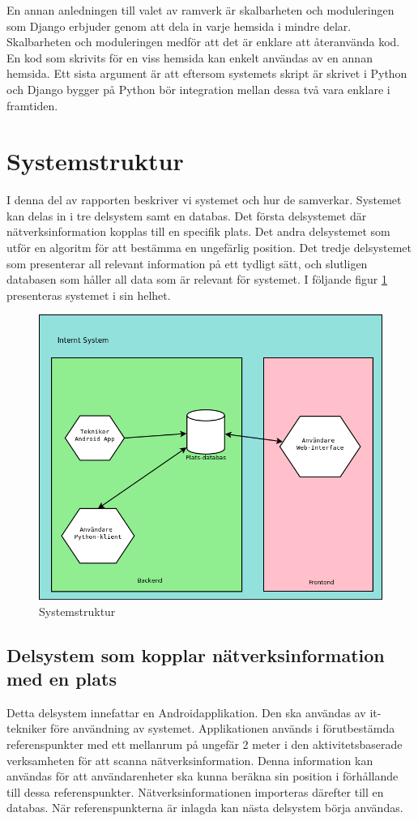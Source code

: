 \documentclass[swedish, a4paper,12pt]{article}
\begin{document}
En annan anledningen till valet av ramverk är skalbarheten och moduleringen som Django erbjuder genom att dela in varje hemsida i mindre delar. Skalbarheten och moduleringen medför att det är enklare att återanvända kod. En kod som skrivits för en viss hemsida kan enkelt användas av en annan hemsida\cite{djangoMVC}. Ett sista argument är att eftersom systemets skript är skrivet i Python och Django bygger på Python bör integration mellan dessa två vara enklare i framtiden.

\section{Systemstruktur}
I denna del av rapporten beskriver vi systemet och hur de samverkar.
Systemet kan delas in i tre delsystem samt en databas. Det första delsystemet där nätverksinformation kopplas till en specifik plats. Det andra delsystemet som utför en algoritm för att bestämma en ungefärlig position. Det tredje delsystemet som presenterar all relevant information på ett tydligt sätt, och slutligen databasen som håller all data som är relevant för systemet.
I följande figur \ref{fig:systemStruktur} presenteras systemet i sin helhet.

\begin{figure}[H]
	\includegraphics[width=15cm]{media/systemStruktur.png}
	\caption{Systemstruktur}
	\label{fig:systemStruktur}
\end{figure}

\subsection{Delsystem som kopplar nätverksinformation med en plats}
Detta delsystem innefattar en Androidapplikation. Den ska användas av it-tekniker före användning av systemet. Applikationen används i förutbestämda referenspunkter med ett mellanrum på ungefär 2 meter i den aktivitetsbaserade verksamheten för att scanna nätverksinformation. Denna information kan användas för att användarenheter ska kunna beräkna sin position i förhållande till dessa referenspunkter. Nätverksinformationen importeras därefter till en databas. När referenspunkterna är inlagda kan nästa delsystem börja användas.
\end{document}

